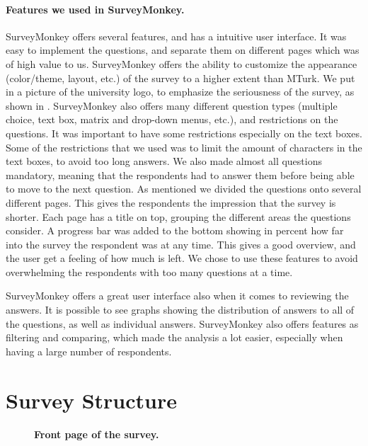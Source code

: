 \paragraph{Features we used in SurveyMonkey.}
SurveyMonkey offers several features, and has a intuitive user interface. It was easy to implement the questions, and separate them on different pages which was of high value to us. SurveyMonkey offers the ability to customize the appearance (color/theme, layout, etc.) of the survey to a higher extent than MTurk. We put in a picture of the university logo, to emphasize the seriousness of the survey, as shown in . SurveyMonkey also offers many different question types (multiple choice, text box, matrix and drop-down menus, etc.), and restrictions on the questions. It was important to have some restrictions especially on the text boxes. Some of the restrictions that we used was to limit the amount of characters in the text boxes, to avoid too long answers. We also made almost all questions mandatory, meaning that the respondents had to answer them before being able to move to the next question. As mentioned we divided the questions onto several different pages. This gives the respondents the impression that the survey is shorter. Each page has a title on top, grouping the different areas the questions consider. A progress bar was added to the bottom showing in percent how far into the survey the respondent was at any time. This gives a good overview, and the user get a feeling of how much is left. We chose to use these features to avoid overwhelming the respondents with too many questions at a time. 

SurveyMonkey offers a great user interface also when it comes to reviewing the answers. It is possible to see graphs showing the distribution of answers to all of the questions, as well as individual answers. SurveyMonkey also offers features as filtering and comparing, which made the analysis a lot easier, especially when having a large number of respondents. 

\section{Survey Structure} 

\begin{figure}[t]
\centering
{}
\caption[Front page of the survey]{\textbf{Front page of the survey.}} 
\label{fig:frontpage}
\end{figure}

